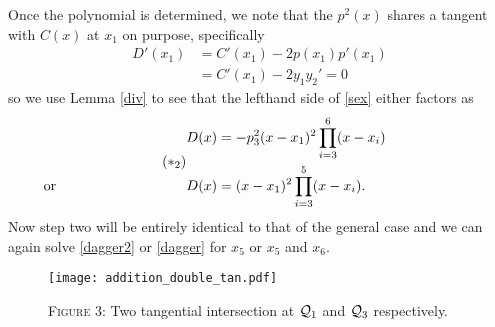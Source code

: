 \documentclass[english,11pt,a4paper]{article}
\begin{document}
\begin{case}
  Once the polynomial is determined, we note that the $p^2(x)$ shares a tangent with $C(x)$ at $x_1$ on purpose, specifically
  \begin{align*}
    D'(x_1) &= C'(x_1) - 2 p(x_1)p'(x_1)\\
            &= C'(x_1) - 2 y_1 y_2' = 0
  \end{align*}
  so we use Lemma \ref{div} to see that the lefthand side of \eqref{sex} either factors as
  \begin{align} \tag{$*_2$} \begin{split}
    D(x) &= -p_3^2(x-x_1)^2 \prod_{i=3}^6(x-x_i)\\
    \rlap{\hspace{-37mm} or}
    D(x) &= (x-x_1)^2 \prod_{i=3}^5(x-x_i).
  \end{split} \end{align}
  Now step two will be entirely identical to that of the general case and we can again solve \eqref{dagger2} or \eqref{dagger} for $x_5$ or $x_5$ and $x_6$.
\end{case}

\begin{figure}[ht]
  \fline
  \begin{center}
    \vspace{1mm}
    \texttt{[image: addition\_double\_tan.pdf]}

    {\scshape Figure 3}: Two tangential intersection at $\mathcal{Q}_1$ and $\mathcal{Q}_3$ respectively.
  \end{center}
  \vspace{-1.5mm}
  \fline
\end{figure}
\end{document}
